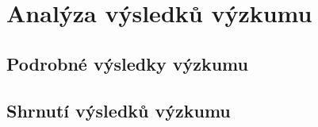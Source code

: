 \section{Analýza výsledků výzkumu}
\subsection{Podrobné výsledky výzkumu}
\subsection{Shrnutí výsledků výzkumu}